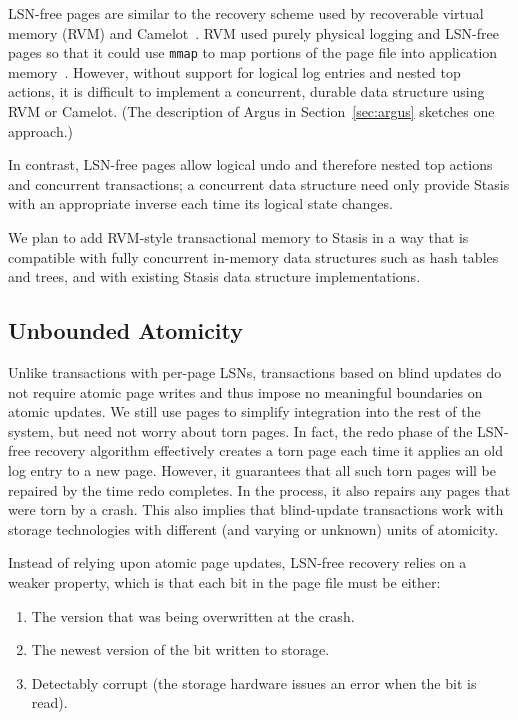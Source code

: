 \documentclass[letterpaper,twocolumn,10pt]{article}
\newcommand{\yad}{Stasis\xspace}
\begin{document}
LSN-free pages are similar to the recovery scheme used by
recoverable virtual memory (RVM) and Camelot~\cite{camelot}. RVM
used purely physical logging and LSN-free pages so that it
could use {\tt mmap} to map portions of the page file into application
memory~\cite{lrvm}.  However, without support for logical log entries
and nested top actions, it is difficult to implement a
concurrent, durable data structure using RVM or Camelot.  (The description of
Argus in Section~\ref{sec:argus} sketches one
 approach.)

In contrast, LSN-free pages allow logical
undo and therefore nested top actions and concurrent
transactions; a concurrent data structure need only provide \yad
with an appropriate inverse each time its logical state changes.

We plan to add RVM-style transactional memory to \yad in a way that is
compatible with fully concurrent in-memory data structures such as
hash tables and trees, and with existing
\yad data structure implementations.


\subsection{Unbounded Atomicity}
\label{sec:torn-page}


Unlike transactions with per-page LSNs, transactions based on blind 
updates do not require atomic page writes
and thus impose no meaningful boundaries on atomic updates.  We still
use pages to simplify integration into the rest of the system, but
need not worry about torn pages.  In fact, the redo phase of the
LSN-free recovery algorithm effectively creates a torn page each time it
applies an old log entry to a new page.  However, it guarantees that
all such torn pages will be repaired by the time redo completes.  In
the process, it also repairs any pages that were torn by a crash.
This also implies that blind-update transactions work with storage technologies with
different (and varying or unknown) units of atomicity.

Instead of relying upon atomic page updates, LSN-free recovery relies
on a weaker property, which is that each bit in the page file must
be either:
\begin{enumerate}
\item The version that was being overwritten at the crash.
\item The newest version of the bit written to storage.
\item Detectably corrupt (the storage hardware issues an error when the
  bit is read).
\end{enumerate}
\end{document}
